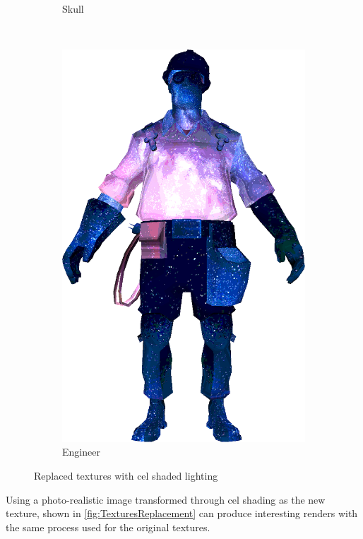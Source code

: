 \begin{figure}[h]
\begin{subfigure}[b]{0.16\textwidth}
        \caption{Skull}
        \label{fig:TextureReplacementSkull}
    \end{subfigure}
~
\hspace{24pt}
~
    \centering
    \begin{subfigure}[b]{0.13\textwidth}
        \includegraphics[width=\textwidth]{img/Combined/SpaceEngineerNoContour.png}
        \caption{Engineer}
        \label{fig:TextureReplacement}
    \end{subfigure}
    \caption{Replaced textures with cel shaded lighting}
    \label{fig:TexturesReplacement}
\end{figure}

Using a photo-realistic image transformed through cel shading as the new texture, shown in \autoref{fig:TexturesReplacement} can produce interesting 
renders with the same process used for the original textures. 

